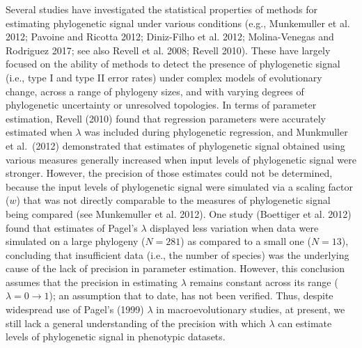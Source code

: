 \documentclass[
]{article}
\begin{document}
Several studies have investigated the statistical properties of methods
for estimating phylogenetic signal under various conditions (e.g.,
Munkemuller et al. 2012; Pavoine and Ricotta 2012; Diniz-Filho et al.
2012; Molina-Venegas and Rodriguez 2017; see also Revell et al. 2008;
Revell 2010). These have largely focused on the ability of methods to
detect the presence of phylogenetic signal (i.e., type I and type II
error rates) under complex models of evolutionary change, across a range
of phylogeny sizes, and with varying degrees of phylogenetic uncertainty
or unresolved topologies. In terms of parameter estimation, Revell
(2010) found that regression parameters were accurately estimated when
\(\lambda\) was included during phylogenetic regression, and Munkmuller
et al.~(2012) demonstrated that estimates of phylogenetic signal
obtained using various measures generally increased when input levels of
phylogenetic signal were stronger. However, the precision of those
estimates could not be determined, because the input levels of
phylogenetic signal were simulated via a scaling factor (\(w\)) that was
not directly comparable to the measures of phylogenetic signal being
compared (see Munkemuller et al. 2012). One study (Boettiger et al.
2012) found that estimates of Pagel's \(\lambda\) displayed less
variation when data were simulated on a large phylogeny (\(N=281\)) as
compared to a small one (\(N=13\)), concluding that insufficient data
(i.e., the number of species) was the underlying cause of the lack of
precision in parameter estimation. However, this conclusion assumes that
the precision in estimating \(\lambda\) remains constant across its
range (\(\lambda = 0 \to 1\)); an assumption that to date, has not been
verified. Thus, despite widespread use of Pagel's (1999) \(\lambda\) in
macroevolutionary studies, at present, we still lack a general
understanding of the precision with which \(\lambda\) can estimate
levels of phylogenetic signal in phenotypic datasets. \hfill\break
\end{document}
